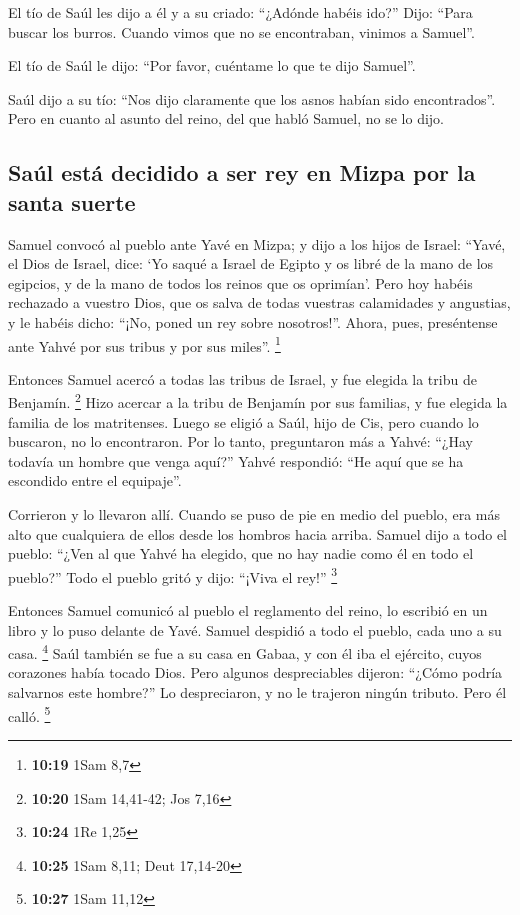  El tío de Saúl les dijo a él y a su criado: ``¿Adónde
habéis ido?'' Dijo: ``Para buscar los burros. Cuando vimos que no se
encontraban, vinimos a Samuel''.

 El tío de Saúl le dijo: ``Por favor, cuéntame lo que te
dijo Samuel''.

 Saúl dijo a su tío: ``Nos dijo claramente que los asnos
habían sido encontrados''. Pero en cuanto al asunto del reino, del que
habló Samuel, no se lo dijo.

\hypertarget{sauxfal-estuxe1-decidido-a-ser-rey-en-mizpa-por-la-santa-suerte}{%
\subsection{Saúl está decidido a ser rey en Mizpa por la santa
suerte}\label{sauxfal-estuxe1-decidido-a-ser-rey-en-mizpa-por-la-santa-suerte}}

 Samuel convocó al pueblo ante Yavé en Mizpa;
 y dijo a los hijos de Israel: ``Yavé, el Dios de Israel,
dice: `Yo saqué a Israel de Egipto y os libré de la mano de los
egipcios, y de la mano de todos los reinos que os oprimían'.
 Pero hoy habéis rechazado a vuestro Dios, que os salva
de todas vuestras calamidades y angustias, y le habéis dicho: ``¡No,
poned un rey sobre nosotros!''. Ahora, pues, preséntense ante Yahvé por
sus tribus y por sus miles''. \footnote{\textbf{10:19} 1Sam 8,7}

 Entonces Samuel acercó a todas las tribus de Israel, y
fue elegida la tribu de Benjamín. \footnote{\textbf{10:20} 1Sam
  14,41-42; Jos 7,16}  Hizo acercar a la tribu de
Benjamín por sus familias, y fue elegida la familia de los matritenses.
Luego se eligió a Saúl, hijo de Cis, pero cuando lo buscaron, no lo
encontraron.  Por lo tanto, preguntaron más a Yahvé:
``¿Hay todavía un hombre que venga aquí?'' Yahvé respondió: ``He aquí
que se ha escondido entre el equipaje''.

 Corrieron y lo llevaron allí. Cuando se puso de pie en
medio del pueblo, era más alto que cualquiera de ellos desde los hombros
hacia arriba.  Samuel dijo a todo el pueblo: ``¿Ven al
que Yahvé ha elegido, que no hay nadie como él en todo el pueblo?'' Todo
el pueblo gritó y dijo: ``¡Viva el rey!'' \footnote{\textbf{10:24} 1Re
  1,25}

 Entonces Samuel comunicó al pueblo el reglamento del
reino, lo escribió en un libro y lo puso delante de Yavé. Samuel
despidió a todo el pueblo, cada uno a su casa. \footnote{\textbf{10:25}
  1Sam 8,11; Deut 17,14-20}  Saúl también se fue a su
casa en Gabaa, y con él iba el ejército, cuyos corazones había tocado
Dios.  Pero algunos despreciables dijeron: ``¿Cómo podría
salvarnos este hombre?'' Lo despreciaron, y no le trajeron ningún
tributo. Pero él calló. \footnote{\textbf{10:27} 1Sam 11,12}


